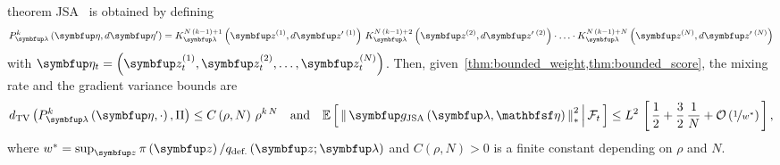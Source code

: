 
\begin{theoremEnd}{theorem}\label{thm:jsa}
  JSA~\citep{pmlr-v124-ou20a} is obtained by defining 
  {%
  \begin{align*}
  P_{\vlambda}^k\left(\veta, d\veta^{\prime}\right)
  = 
  K_{\vlambda}^{N\,\left(k-1\right) + 1}\left(\vz^{(1)}, d\vz^{\prime\;(1)}\right)
  \,
  K_{\vlambda}^{N\,\left(k-1\right) + 2}\left(\vz^{(2)}, d\vz^{\prime\;(2)}\right)
  \cdot
  \ldots 
  \cdot
  K_{\vlambda}^{N\,\left(k-1\right) + N}\left(\vz^{(N)}, d\vz^{\prime\;(N)}\right)
  \end{align*}
  }
  with \(\veta_t = \left(\vz_t^{(1)}, \vz_t^{(2)}, \ldots, \vz_t^{(N)}\right)\).
  Then, given~\cref{thm:bounded_weight,thm:bounded_score}, the mixing rate and the gradient variance bounds are
  {%
  \begin{align*}
    \DTV{P_{\vlambda}^k\left(\veta, \cdot\right)}{\Pi}
    \leq
    C\left(\rho, N\right)\,{\rho}^{k\,N}
    \quad\text{and}\quad
    \E{ \norm{ \vg_{\mathrm{JSA}}\left(\vlambda, \rvveta\right) }^2_{*} \,\middle|\, \mathcal{F}_{t} }
    \leq
    L^2 \,
    \left[\,
    \frac{1}{2} + \frac{3}{2}\,\frac{1}{N}
    + \mathcal{O}\left(\nicefrac{1}{w^*}\right)
    \,\right],
  \end{align*}
  }%
  where \(w^* = \sup_{\vz} \pi\left(\vz\right) / q_{\text{def.}}\left(\vz;\vlambda\right)\) and \(C\left(\rho, N\right) > 0\) is a finite constant depending on \(\rho\) and \(N\).
\end{theoremEnd}
